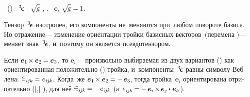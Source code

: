 \begin{otherlanguage}{russian}
~()  ~${^3\hspace{-0.25ex}\bm{\epsilon}}\hspace{.05ex}$
 ~\!${\sqrt{\hspace{-0.36ex}\mathstrut{\textsl{g}}}}$ , .
~${\bm{e}_i}$ 
${\hspace{-0.25ex}\sqrt{\hspace{-0.36ex}\mathstrut{\textsl{g}\hspace{.12ex}}} = \hspace{-0.1ex} 1}$.

Тензор~${^3\hspace{-0.25ex}\bm{\epsilon}}\hspace{.05ex}$ изотропен, его компоненты не~меняются при~\hbox{любом} повороте базиса.
Но отражение\:--- изменение ориентации тройки базисных векторов~(перемена )\:---
меняет знак~${^3\hspace{-0.25ex}\bm{\epsilon}}\hspace{.05ex}$, и~поэтому он является псевдотензором.

Если ${\bm{e}_1 \hspace{-0.2ex} \times \bm{e}_2 \hspace{-0.15ex} = \bm{e}_3}$,
то ${\bm{e}_i}$\:--- произвольно выбираемая из двух вариантов () как ориентированная положительно () \hbox{тройка},
и~компоненты~${^3\hspace{-0.25ex}\bm{\epsilon}}\hspace{.05ex}$ равны символу Веблена:
${\levicivita_{i\hspace{-0.1ex}j\hspace{-0.1ex}k} \hspace{-0.1ex} = \hspace{.1ex} e_{i\hspace{-0.1ex}j\hspace{-0.1ex}k}}$.
Когда~же ${\bm{e}_1 \hspace{-0.2ex} \times \bm{e}_2 \hspace{-0.15ex} = - \hspace{.25ex} \bm{e}_3}$, тогда тройка~${\bm{e}_i}$ ориентирована отрицательно ([,] ),
для неё ${\levicivita_{i\hspace{-0.1ex}j\hspace{-0.1ex}k} \hspace{-0.1ex} = - \hspace{.2ex} e_{i\hspace{-0.1ex}j\hspace{-0.1ex}k}}$
(а~${e_{i\hspace{-0.1ex}j\hspace{-0.1ex}k} \hspace{-0.12ex} = - \hspace{.33ex} \bm{e}_i \hspace{-0.2ex} \times \hspace{-0.2ex} \bm{e}_j \hspace{-0.1ex} \dotp \hspace{.12ex} \bm{e}_k}$).


\end{otherlanguage}
